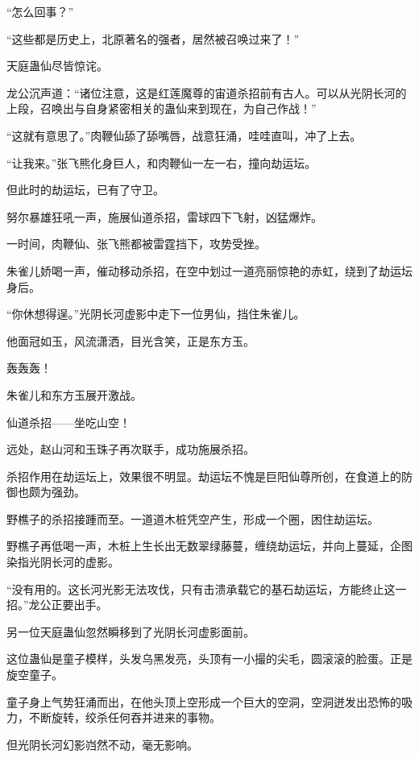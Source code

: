 
\begin{this_body}



“怎么回事？”

“这些都是历史上，北原著名的强者，居然被召唤过来了！”

天庭蛊仙尽皆惊诧。

龙公沉声道：“诸位注意，这是红莲魔尊的宙道杀招前有古人。可以从光阴长河的上段，召唤出与自身紧密相关的蛊仙来到现在，为自己作战！”

“这就有意思了。”肉鞭仙舔了舔嘴唇，战意狂涌，哇哇直叫，冲了上去。

“让我来。”张飞熊化身巨人，和肉鞭仙一左一右，撞向劫运坛。

但此时的劫运坛，已有了守卫。

努尔暴雄狂吼一声，施展仙道杀招，雷球四下飞射，凶猛爆炸。

一时间，肉鞭仙、张飞熊都被雷霆挡下，攻势受挫。

朱雀儿娇喝一声，催动移动杀招，在空中划过一道亮丽惊艳的赤虹，绕到了劫运坛身后。

“你休想得逞。”光阴长河虚影中走下一位男仙，挡住朱雀儿。

他面冠如玉，风流潇洒，目光含笑，正是东方玉。

轰轰轰！

朱雀儿和东方玉展开激战。

仙道杀招——坐吃山空！

远处，赵山河和玉珠子再次联手，成功施展杀招。

杀招作用在劫运坛上，效果很不明显。劫运坛不愧是巨阳仙尊所创，在食道上的防御也颇为强劲。

野樵子的杀招接踵而至。一道道木桩凭空产生，形成一个圈，困住劫运坛。

野樵子再低喝一声，木桩上生长出无数翠绿藤蔓，缠绕劫运坛，并向上蔓延，企图染指光阴长河的虚影。

“没有用的。这长河光影无法攻伐，只有击溃承载它的基石劫运坛，方能终止这一招。”龙公正要出手。

另一位天庭蛊仙忽然瞬移到了光阴长河虚影面前。

这位蛊仙是童子模样，头发乌黑发亮，头顶有一小撮的尖毛，圆滚滚的脸蛋。正是旋空童子。

童子身上气势狂涌而出，在他头顶上空形成一个巨大的空洞，空洞迸发出恐怖的吸力，不断旋转，绞杀任何吞并进来的事物。

但光阴长河幻影岿然不动，毫无影响。


\end{this_body}
